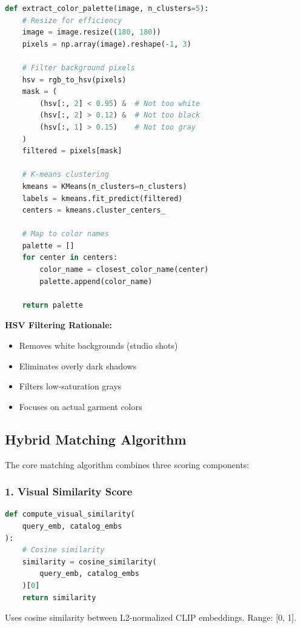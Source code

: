\documentclass[12pt,a4paper]{report}
\begin{document}
\begin{lstlisting}[language=Python]
def extract_color_palette(image, n_clusters=5):
    # Resize for efficiency
    image = image.resize((180, 180))
    pixels = np.array(image).reshape(-1, 3)
    
    # Filter background pixels
    hsv = rgb_to_hsv(pixels)
    mask = (
        (hsv[:, 2] < 0.95) &  # Not too white
        (hsv[:, 2] > 0.12) &  # Not too black
        (hsv[:, 1] > 0.15)    # Not too gray
    )
    filtered = pixels[mask]
    
    # K-means clustering
    kmeans = KMeans(n_clusters=n_clusters)
    labels = kmeans.fit_predict(filtered)
    centers = kmeans.cluster_centers_
    
    # Map to color names
    palette = []
    for center in centers:
        color_name = closest_color_name(center)
        palette.append(color_name)
    
    return palette
\end{lstlisting}

\textbf{HSV Filtering Rationale:}
\begin{itemize}
    \item Removes white backgrounds (studio shots)
    \item Eliminates overly dark shadows
    \item Filters low-saturation grays
    \item Focuses on actual garment colors
\end{itemize}

\subsection{Hybrid Matching Algorithm}

The core matching algorithm combines three scoring components:

\subsubsection{1. Visual Similarity Score}

\begin{lstlisting}[language=Python]
def compute_visual_similarity(
    query_emb, catalog_embs
):
    # Cosine similarity
    similarity = cosine_similarity(
        query_emb, catalog_embs
    )[0]
    return similarity
\end{lstlisting}

Uses cosine similarity between L2-normalized CLIP embeddings. Range: [0, 1].
\end{document}
